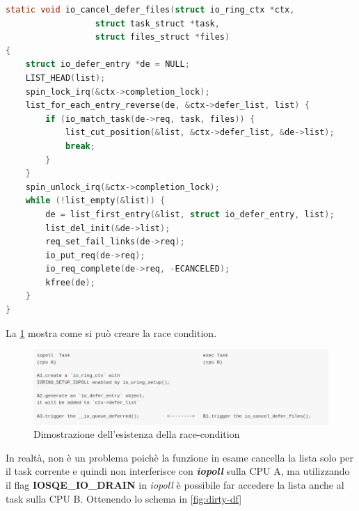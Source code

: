 \documentclass{article}
\begin{document}
\begin{lstlisting}[language=C,style=CStyle,caption="Funzione vittima: accede alla defer\_list senza utilizzare uno spinlock"]
static void io_cancel_defer_files(struct io_ring_ctx *ctx,
                  struct task_struct *task,
                  struct files_struct *files)
{
    struct io_defer_entry *de = NULL;
    LIST_HEAD(list);
    spin_lock_irq(&ctx->completion_lock);
    list_for_each_entry_reverse(de, &ctx->defer_list, list) {
        if (io_match_task(de->req, task, files)) {
            list_cut_position(&list, &ctx->defer_list, &de->list);
            break;
        }
    }
    spin_unlock_irq(&ctx->completion_lock);
    while (!list_empty(&list)) {
        de = list_first_entry(&list, struct io_defer_entry, list);
        list_del_init(&de->list);
        req_set_fail_links(de->req);
        io_put_req(de->req);
        io_req_complete(de->req, -ECANCELED);
        kfree(de);
    }
}
\end{lstlisting}

La \cref{fig:dirty-rc} mostra come si può creare la race condition. 

\begin{figure}[h]
  \begin{center}
    \includegraphics[width=.7\textwidth]{figures/ch1/dirtypt_1-df.png}
  \end{center}
  \caption{Dimostrazione dell'esistenza della race-condition}\label{fig:dirty-rc}
\end{figure}


In realtà, non è un problema poichè la funzione in esame cancella la lista solo per il task 
corrente e quindi non interferisce con \textbf{\textit{iopoll}} sulla CPU A, ma utilizzando 
il flag \textbf{IOSQE\_IO\_DRAIN} in \textit{iopoll} è possibile far accedere la lista 
anche al task sulla CPU B. Ottenendo lo schema in \cref{fig:dirty-df}
\end{document}
